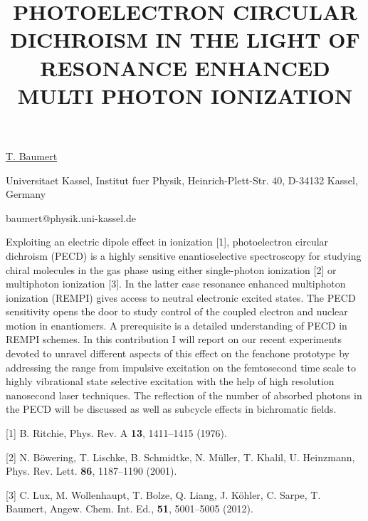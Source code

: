 \title{PHOTOELECTRON CIRCULAR DICHROISM IN THE LIGHT OF RESONANCE ENHANCED MULTI PHOTON IONIZATION}

\underline{T. Baumert} 

{\normalsize{\vspace{-4mm}
Universitaet Kassel,
Institut fuer Physik,
Heinrich-Plett-Str. 40,
D-34132 Kassel, Germany           



\email baumert@physik.uni-kassel.de}}

Exploiting an electric dipole effect in ionization [1], photoelectron circular dichroism (PECD) is a highly sensitive enantioselective spectroscopy for studying chiral molecules in the gas phase using either single-photon ionization [2] or multiphoton ionization [3].  In the latter case resonance enhanced multiphoton ionization (REMPI) gives access to neutral electronic excited states.  The PECD sensitivity opens the door to study control of the coupled electron and nuclear motion in enantiomers.  A prerequisite is a detailed understanding of PECD in REMPI schemes.  In this contribution I will report on our recent experiments devoted to unravel different aspects of this effect on the fenchone prototype by addressing the range from impulsive excitation on the femtosecond time scale to highly vibrational state selective excitation with the help of high resolution nanosecond laser techniques.  The reflection of the number of absorbed photons in the PECD will be discussed as well as subcycle effects in bichromatic fields.

{\normalsize
[1] B. Ritchie, Phys. Rev. A \textbf{13}, 1411–1415 (1976).
\vsp

[2] N. Böwering, T. Lischke, B. Schmidtke, N. Müller, T. Khalil, U. Heinzmann, Phys. Rev. Lett. \textbf{86}, 1187–1190 (2001).
\vsp

[3] C. Lux, M. Wollenhaupt, T. Bolze, Q. Liang, J. Köhler, C. Sarpe, T. Baumert, Angew. Chem. Int. Ed., \textbf{51}, 5001–5005 (2012).
}

\vspace{\baselineskip}